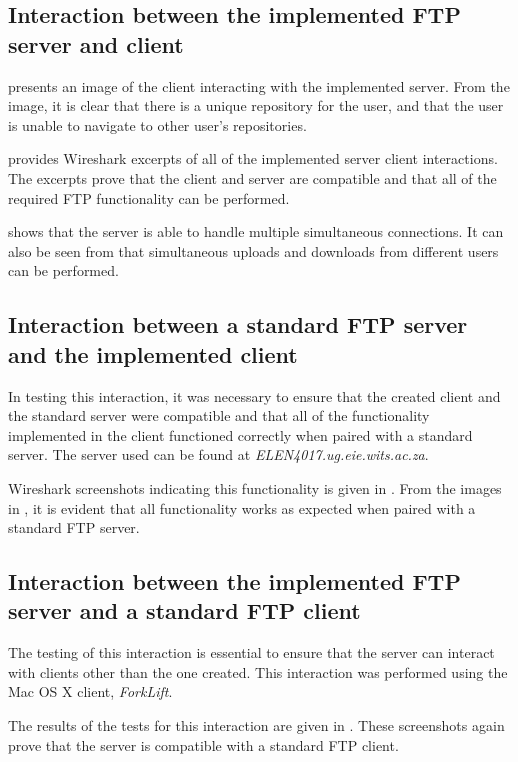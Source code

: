 \documentclass[10pt,twocolumn]{witseiepaper}
\begin{document}
\subsection{Interaction between the implemented FTP server and client}

 presents an image of the client interacting with the implemented server. From the image, it is clear that there is a unique repository for the user, and that the user is unable to navigate to other user's repositories.

 provides Wireshark excerpts of all of the implemented server client interactions. The excerpts prove that the client and server are compatible and that all of the required FTP functionality can be performed.

 shows that the server is able to handle multiple simultaneous connections. It can also be seen  from  that simultaneous uploads and downloads from different users can be performed.

\subsection{Interaction between a standard FTP server and the implemented client}
In testing this interaction, it was necessary to ensure that the created client and the standard server were compatible and that all of the functionality implemented in the client functioned correctly when paired with a standard server. The server used can be found at \textit{ELEN4017.ug.eie.wits.ac.za}.

Wireshark screenshots indicating this functionality is given in . From the images in , it is evident that all functionality works as expected when paired with a standard FTP server.

\subsection{Interaction between the implemented FTP server and a standard FTP client}
The testing of this interaction is essential to ensure that the server can interact with clients other than the one created. This interaction was performed using the Mac OS X client, \textit{ForkLift}.

The results of the tests for this interaction are given in . These screenshots again prove that the server is compatible with a standard FTP client.
\end{document}
